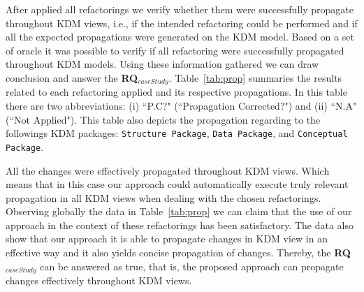 After applied all refactorings we verify whether them were successfully propagate throughout KDM views, i.e., if the intended refactoring could be performed and if all the expected propagations were generated on the KDM model. 
Based on a set of oracle it was possible to verify if all refactoring were successfully propagated throughout KDM models. Using these information gathered we can draw conclusion and answer the \textbf{RQ$_{caseStudy}$}. Table~\ref{tab:prop} summaries the results related to each refactoring applied and its respective propagations. In this table there are two abbreviations: (i) ``P.C?" (``Propagation Corrected?") and (ii) ``N.A" (``Not Applied"). This table also depicts the propagation regarding to the followings KDM packages: \texttt{Structure Package}, \texttt{Data Package}, and \texttt{Conceptual Package}. 

All the changes were effectively propagated throughout KDM views. Which means that in this case our approach could automatically execute truly relevant propagation in all KDM views when dealing with the chosen refactorings. Observing globally the data in Table~\ref{tab:prop} we can claim that the use of our approach in the context of these refactorings has been satisfactory. The data also show that our approach it is able to propagate changes in KDM view in an effective way and it also yields concise propagation of changes. Thereby, the \textbf{RQ$_{caseStudy}$} can be answered as true, that is, the proposed approach can propagate changes effectively throughout KDM views.

